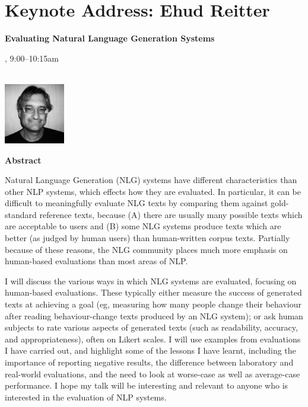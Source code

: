 \section{Keynote Address: Ehud Reitter}

\begin{center}
\begin{Large}
{\bfseries\Large Evaluating Natural Language Generation Systems}
\vspace{1em}\par
\end{Large}

\daydateyear, 9:00--10:15am \vspace{1em}\\
\PlenaryLoc \\
\vspace{1em}\par
\includegraphics[height=100px]{content/day3/ehud-hs-bw.jpg}
\end{center}

\noindent
{\bfseries Abstract} 

Natural Language Generation (NLG) systems have different characteristics than
other NLP systems, which effects how they are evaluated. In particular, it can be 
difficult to meaningfully evaluate NLG texts by comparing them against gold-
standard reference texts, because (A) there are usually many possible texts which 
are acceptable to users and (B) some NLG systems produce texts which are better 
(as judged by human users) than human-written corpus texts. Partially because of 
these reasons, the NLG community places much more emphasis on human-based 
evaluations than most areas of NLP.

I will discuss the various ways in which NLG systems are evaluated, focusing on 
human-based evaluations. These typically either measure the success of generated 
texts at achieving a goal (eg, measuring how many people change their behaviour 
after reading behaviour-change texts produced by an NLG system); or ask human 
subjects to rate various aspects of generated texts (such as readability, accuracy, 
and appropriateness), often on Likert scales. I will use examples from evaluations I 
have carried out, and highlight some of the lessons I have learnt, including the 
importance of reporting negative results, the difference between laboratory and 
real-world evaluations, and the need to look at worse-case as well as average-case 
performance. I hope my talk will be interesting and relevant to anyone who is 
interested in the evaluation of NLP systems.

